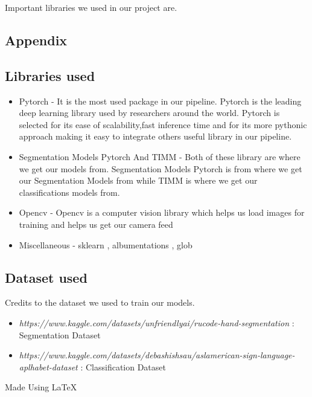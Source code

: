 \documentclass[14pt]{extarticle}
\begin{document}
    \begin{figure}[H]
        \begin{subfigure}[b]{0.5\textwidth}
            \label{fig:7}


            \label{fig:Figure 8}
        \end{subfigure}

    \end{figure}


    Important libraries we used in our project are.
    \begin{multicols}{2}

        \section{Appendix}\label{sec:Appendix}

        \subsection{Libraries used}\label{subsec:libraries}
        \begin{itemize}

            \item  Pytorch - It is the most used package in our pipeline.
            Pytorch is the leading deep learning library used by researchers around the world.
            Pytorch is selected for its ease of scalability,fast inference time and for its more pythonic approach making it
            easy to integrate others useful library in our pipeline.
            \item Segmentation Models Pytorch And TIMM - Both of these library are where we get our models from.
            Segmentation Models Pytorch is from where we get our Segmentation Models from while TIMM is where we get our classifications models from.
            \item Opencv - Opencv is a computer vision library which helps us load images for training and helps us get our camera feed
            \item Miscellaneous - sklearn , albumentations , glob
        \end{itemize}

        \subsection{Dataset used}\label{subsec:Dataset}
        Credits to the dataset we used to train our models.
        \begin{itemize}

            \item \emph{https://www.kaggle.com/datasets/unfriendlyai/rucode-hand-segmentation} : Segmentation Dataset
            \item \emph{https://www.kaggle.com/datasets/debashishsau/aslamerican-sign-language-aplhabet-dataset} : Classification Dataset
        \end{itemize}


    \end{multicols}
    Made Using \LaTeX{}
\end{document}
